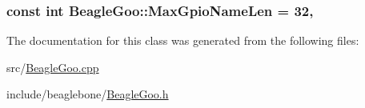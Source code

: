 \hypertarget{struct_beagle_goo_ae4b9d09b2bfaf386c5d6fb9fdee0d4fa}{
\subsubsection[{Max\-Gpio\-Name\-Len}]{\setlength{\rightskip}{0pt plus 5cm}const int Beagle\-Goo\-::\-Max\-Gpio\-Name\-Len = 32\hspace{0.3cm}{\ttfamily [static]}, {\ttfamily [protected]}}}\label{struct_beagle_goo_ae4b9d09b2bfaf386c5d6fb9fdee0d4fa}


The documentation for this class was generated from the following files\-:\begin{DoxyCompactItemize}
\item 
src/\hyperlink{_beagle_goo_8cpp}{Beagle\-Goo.\-cpp}\item 
include/beaglebone/\hyperlink{_beagle_goo_8h}{Beagle\-Goo.\-h}\end{DoxyCompactItemize}

